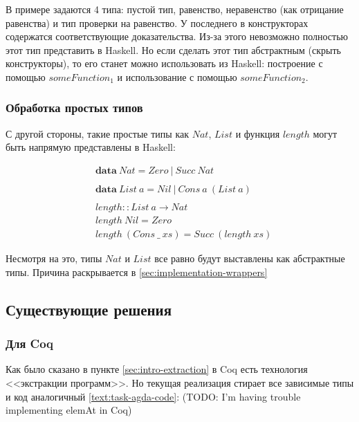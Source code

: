 В примере задаются 4 типа: пустой тип, равенство, неравенство
(как отрицание равенства) и тип проверки на равенство. У последнего
в конструкторах содержатся соответствующие доказательства. Из-за этого
невозможно полностью этот тип представить в Haskell. Но если сделать этот
тип абстрактным (скрыть конструкторы), то его станет можно использовать из
Haskell: построение с помощью \(someFunction_1\) и использование с помощью
\(someFunction_2\).

\subsubsection{Обработка простых типов}

С другой стороны, такие простые типы как \(Nat\), \(List\) и
функция \(length\) могут быть напрямую представлены в Haskell:

\begin{align*}
&\mathbf{data}\ Nat = Zero\ |\ Succ\ Nat\\
\\
&\mathbf{data}\ List\ a = Nil\ |\ Cons\ a\ (List\ a)\\
\\
&length :: List\ a \rightarrow Nat\\
&length\ Nil = Zero\\
&length\ (Cons\ \_\ xs) = Succ\ (length\ xs)
\end{align*}

Несмотря на это, типы \(Nat\) и \(List\) все равно будут выставлены
как абстрактные типы. Причина раскрывается в \ref{sec:implementation-wrappers}

\subsection{Существующие решения}

\subsubsection{Для Coq}

Как было сказано в пункте \ref{sec:intro-extraction} в Coq есть технология
<<экстракции программ>>. Но текущая реализация стирает все зависимые типы и
код аналогичный \ref{text:task-agda-code}:
(TODO: I'm having trouble implementing elemAt in Coq)

